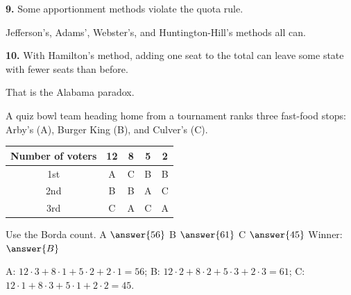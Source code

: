 \documentclass[12pt]{ximera}
\begin{document}
\begin{problem}
\begin{prompt}
\textbf{9.} Some apportionment methods violate the quota rule.
\begin{multipleChoice}
\end{multipleChoice}
\begin{feedback}
Jefferson's, Adams', Webster's, and Huntington-Hill's methods all can.
\end{feedback}
\end{prompt}

\begin{prompt}
\textbf{10.} With Hamilton's method, adding one seat to the total can leave some state with fewer seats than before.
\begin{multipleChoice}
\end{multipleChoice}
\begin{feedback}
That is the Alabama paradox.
\end{feedback}
\end{prompt}
\end{problem}

\begin{problem}
A quiz bowl team heading home from a tournament ranks three fast-food stops: Arby's (A),
Burger King (B), and Culver's (C).
\begin{center}
\begin{tabular}{c|cccc}
Number of voters & 12 & 8 & 5 & 2\\\hline
1st & A & C & B & B\\
2nd & B & B & A & C\\
3rd & C & A & C & A
\end{tabular}
\end{center}
Use the Borda count. A $\answer{56}$ \quad B $\answer{61}$ \quad C $\answer{45}$ \qquad
Winner: $\answer{B}$

\begin{feedback}
A: $12\cdot3+8\cdot1+5\cdot2+2\cdot1=56$; B: $12\cdot2+8\cdot2+5\cdot3+2\cdot3=61$;
C: $12\cdot1+8\cdot3+5\cdot1+2\cdot2=45$.
\end{feedback}
\end{problem}
\end{document}
